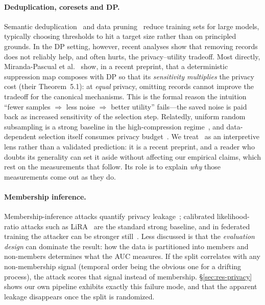 \documentclass[pdflatex,sn-mathphys-num]{sn-jnl}
\theoremstyle{thmstyleone}
\theoremstyle{thmstyletwo}
\theoremstyle{thmstylethree}
\begin{document}
\paragraph{Deduplication, coresets and DP.} Semantic
deduplication~\cite{abbas2023semdedup} and data pruning~\cite{marion2023scaling}
reduce training sets for large models, typically choosing thresholds to hit a
target size rather than on principled grounds. In the DP setting, however, recent
analyses show that removing records does not reliably help, and often hurts, the
privacy--utility tradeoff. Most directly, Miranda-Pascual et
al.~\cite{stoddard2026suppress} show, in a recent preprint, that a deterministic
suppression map composes with DP so that its \emph{sensitivity multiplies} the privacy
cost (their Theorem~5.1): at \emph{equal} privacy, omitting records cannot improve the
tradeoff for the canonical mechanisms. This is the formal reason the intuition
``fewer samples $\Rightarrow$ less noise $\Rightarrow$ better utility'' fails---the
saved noise is paid back as increased sensitivity of the selection step. Relatedly,
uniform random subsampling is a strong baseline in the high-compression
regime~\cite{ayle2023bagging}, and data-dependent selection itself consumes privacy
budget~\cite{nguyen2025coreset}. We treat~\cite{stoddard2026suppress} as an
interpretive lens rather than a validated prediction: it is a recent preprint, and a
reader who doubts its generality can set it aside without affecting our empirical
claims, which rest on the measurements that follow. Its role is to explain
\emph{why} those measurements come out as they do.

\paragraph{Membership inference.} Membership-inference attacks quantify privacy
leakage~\cite{shokri2017membership}; calibrated likelihood-ratio attacks such as
LiRA~\cite{carlini2022membership} are the standard strong baseline, and in federated
training the attacker can be stronger still~\cite{nasr2019comprehensive}. Less
discussed is that the \emph{evaluation design} can dominate the result: how the data
is partitioned into members and non-members determines what the AUC measures. If the
split correlates with any non-membership signal (temporal order being the obvious one
for a drifting process), the attack scores that signal instead of membership.
\S\ref{sec:res-privacy} shows our own pipeline exhibits exactly this failure mode, and that
the apparent leakage disappears once the split is randomized.
\end{document}
